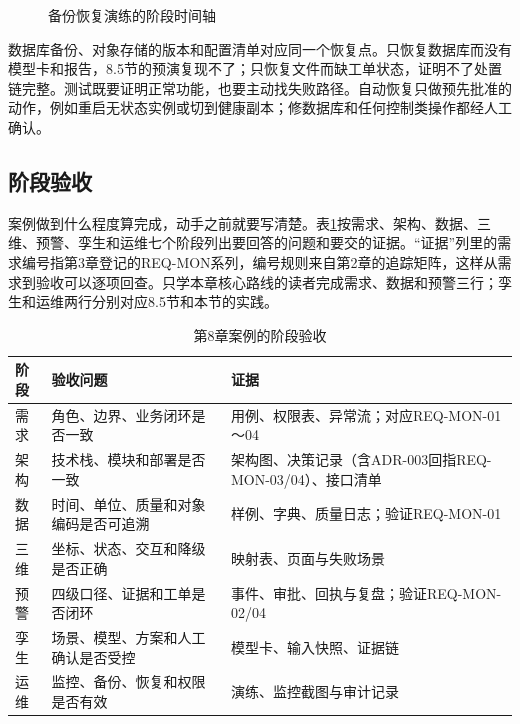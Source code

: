 \begin{figure}[htbp]
\centering
{}
\caption{备份恢复演练的阶段时间轴}
\label{fig:recovery-rehearsal-timeline}
\end{figure}

数据库备份、对象存储的版本和配置清单对应同一个恢复点。只恢复数据库而没有模型卡和报告，8.5节的预演复现不了；只恢复文件而缺工单状态，证明不了处置链完整。测试既要证明正常功能，也要主动找失败路径\cite{myers2011}。自动恢复只做预先批准的动作，例如重启无状态实例或切到健康副本；修数据库和任何控制类操作都经人工确认。

\subsection{阶段验收}

案例做到什么程度算完成，动手之前就要写清楚。表\ref{tab:chapter8-acceptance}按需求、架构、数据、三维、预警、孪生和运维七个阶段列出要回答的问题和要交的证据。“证据”列里的需求编号指第3章登记的REQ-MON系列，编号规则来自第2章的追踪矩阵，这样从需求到验收可以逐项回查。只学本章核心路线的读者完成需求、数据和预警三行；孪生和运维两行分别对应8.5节和本节的实践。

\begin{table}[htbp]
\centering
\caption{第8章案例的阶段验收}
\label{tab:chapter8-acceptance}
\begin{tabular}{p{2.0cm}p{5.0cm}p{5.4cm}}
\toprule
阶段 & 验收问题 & 证据 \\
\midrule
需求 & 角色、边界、业务闭环是否一致 & 用例、权限表、异常流；对应REQ-MON-01～04 \\
架构 & 技术栈、模块和部署是否一致 & 架构图、决策记录（含ADR-003回指REQ-MON-03/04）、接口清单 \\
数据 & 时间、单位、质量和对象编码是否可追溯 & 样例、字典、质量日志；验证REQ-MON-01 \\
三维 & 坐标、状态、交互和降级是否正确 & 映射表、页面与失败场景 \\
预警 & 四级口径、证据和工单是否闭环 & 事件、审批、回执与复盘；验证REQ-MON-02/04 \\
孪生 & 场景、模型、方案和人工确认是否受控 & 模型卡、输入快照、证据链 \\
运维 & 监控、备份、恢复和权限是否有效 & 演练、监控截图与审计记录 \\
\bottomrule
\end{tabular}
\end{table}

